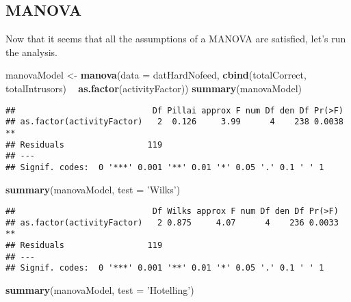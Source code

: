 \documentclass[12pt,]{article}
\newenvironment{Shaded}{\begin{snugshade}}{\end{snugshade}}
\newcommand{\DataTypeTok}[1]{\textcolor[rgb]{0.13,0.29,0.53}{#1}}
\newcommand{\KeywordTok}[1]{\textcolor[rgb]{0.13,0.29,0.53}{\textbf{#1}}}
\newcommand{\NormalTok}[1]{#1}
\newcommand{\OperatorTok}[1]{\textcolor[rgb]{0.81,0.36,0.00}{\textbf{#1}}}
\newcommand{\StringTok}[1]{\textcolor[rgb]{0.31,0.60,0.02}{#1}}
\begin{document}
\hypertarget{manova}{%
\subsection{MANOVA}\label{manova}}

Now that it seems that all the assumptions of a MANOVA are satisfied,
let's run the analysis.

\begin{Shaded}
\begin{Highlighting}[]
\NormalTok{manovaModel <-}\StringTok{ }\KeywordTok{manova}\NormalTok{(}\DataTypeTok{data =}\NormalTok{ datHardNofeed,}
                      \KeywordTok{cbind}\NormalTok{(totalCorrect, totalIntrusors) }\OperatorTok{~}
\StringTok{                        }\KeywordTok{as.factor}\NormalTok{(activityFactor))}
\KeywordTok{summary}\NormalTok{(manovaModel)}
\end{Highlighting}
\end{Shaded}

\begin{verbatim}
##                            Df Pillai approx F num Df den Df Pr(>F)   
## as.factor(activityFactor)   2  0.126     3.99      4    238 0.0038 **
## Residuals                 119                                        
## ---
## Signif. codes:  0 '***' 0.001 '**' 0.01 '*' 0.05 '.' 0.1 ' ' 1
\end{verbatim}

\begin{Shaded}
\begin{Highlighting}[]
\KeywordTok{summary}\NormalTok{(manovaModel, }\DataTypeTok{test =} \StringTok{'Wilks'}\NormalTok{)}
\end{Highlighting}
\end{Shaded}

\begin{verbatim}
##                            Df Wilks approx F num Df den Df Pr(>F)   
## as.factor(activityFactor)   2 0.875     4.07      4    236 0.0033 **
## Residuals                 119                                       
## ---
## Signif. codes:  0 '***' 0.001 '**' 0.01 '*' 0.05 '.' 0.1 ' ' 1
\end{verbatim}

\begin{Shaded}
\begin{Highlighting}[]
\KeywordTok{summary}\NormalTok{(manovaModel, }\DataTypeTok{test =} \StringTok{'Hotelling'}\NormalTok{)}
\end{Highlighting}
\end{Shaded}
\end{document}
